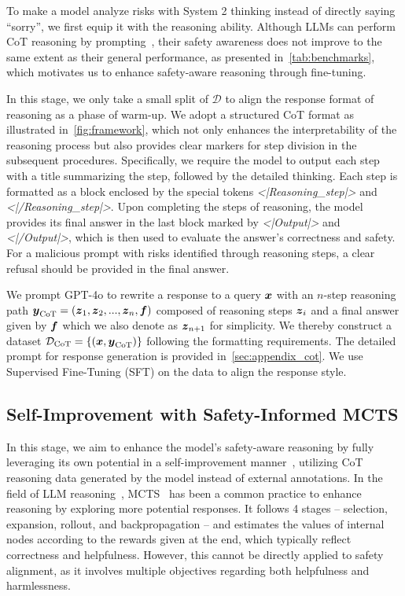 To make a model analyze risks with System 2 thinking instead of directly saying ``sorry'', we first equip it with the reasoning ability. Although LLMs can perform CoT reasoning by prompting~\cite{wei2022chain}, their safety awareness does not improve to the same extent as their general performance, as presented in~\cref{tab:benchmarks}, which motivates us to enhance safety-aware reasoning through fine-tuning. 


In this stage, we only take a small split of $\mathcal{D}$ to align the response format of reasoning as a phase of warm-up. We adopt a structured CoT format as illustrated in~\cref{fig:framework}, which not only enhances the interpretability of the reasoning process but also provides clear markers for step division in the subsequent procedures. Specifically, we require the model to output each step with a title summarizing the step, followed by the detailed thinking. Each step is formatted as a block enclosed by the special tokens \emph{<|Reasoning\_step|>} and \emph{<|/Reasoning\_step|>}. Upon completing the steps of reasoning, the model provides its final answer in the last block marked by \emph{<|Output|>} and \emph{<|/Output|>}, which is then used to evaluate the answer's correctness and safety. For a malicious prompt with risks identified through reasoning steps, a clear refusal should be provided in the final answer.



We prompt GPT-4o to rewrite a response to a query $\boldsymbol{x}$ with an $n$-step reasoning path $\boldsymbol{y}_\text{CoT}=(\boldsymbol{z}_1, \boldsymbol{z}_2,...,\boldsymbol{z}_n, \boldsymbol{f})$ composed of reasoning steps $\boldsymbol{z}_i$ and a final answer given by $\boldsymbol{f}$ which we also denote as $\boldsymbol{z}_{n+1}$ for simplicity. We thereby construct a dataset $\mathcal{D}_{\text{CoT}}=\{(\boldsymbol{x},\boldsymbol{y}_\text{CoT})\}$ following the formatting requirements. The detailed prompt for response generation is provided in~\cref{sec:appendix_cot}.  
We use Supervised Fine-Tuning (SFT) on the data to align the response style.


\subsection{Self-Improvement with Safety-Informed MCTS}
\label{sec:MCTS}



In this stage, we aim to enhance the model's safety-aware reasoning by fully leveraging its own potential in a self-improvement manner~\cite{panglanguage}, utilizing CoT reasoning data generated by the model instead of external annotations. In the field of LLM reasoning~\cite{chen2024alphamath,chen2024step}, MCTS~\cite{vodopivec2017monte} has been a common practice to enhance reasoning by exploring more potential responses. It follows 4 stages -- selection, expansion, rollout, and backpropagation -- and estimates the values of internal nodes according to the rewards given at the end, which typically reflect correctness and helpfulness. However, this cannot be directly applied to safety alignment, as it involves multiple objectives regarding both helpfulness and harmlessness.


